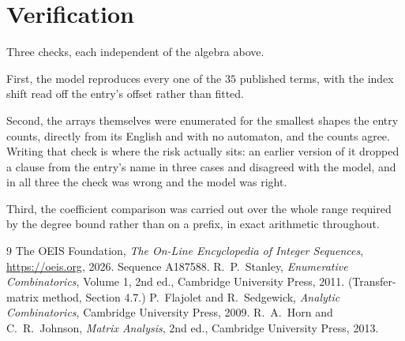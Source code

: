\documentclass[11pt,a4paper]{article}
\theoremstyle{plain}
\theoremstyle{definition}
\begin{document}
\section{Verification}

Three checks, each independent of the algebra above.

First, the model reproduces every one of the $35$ published terms, with the index shift
read off the entry's offset rather than fitted.

Second, the arrays themselves were enumerated for the smallest shapes the entry counts,
directly from its English and with no automaton, and the counts agree. Writing that check is
where the risk actually sits: an earlier version of it dropped a clause from the entry's name
in three cases and disagreed with the model, and in all three the check was wrong and the model
was right.

Third, the coefficient comparison was carried out over the whole range required by the degree
bound rather than on a prefix, in exact arithmetic throughout.

\begin{thebibliography}{9}
 The OEIS Foundation, \emph{The On-Line Encyclopedia of Integer
Sequences}, \url{https://oeis.org}, 2026. Sequence A187588.
 R.~P.~Stanley, \emph{Enumerative Combinatorics}, Volume 1, 2nd ed.,
Cambridge University Press, 2011. (Transfer-matrix method, Section 4.7.)
 P.~Flajolet and R.~Sedgewick, \emph{Analytic Combinatorics}, Cambridge
University Press, 2009.
 R.~A.~Horn and C.~R.~Johnson, \emph{Matrix Analysis}, 2nd ed., Cambridge
University Press, 2013.
\end{thebibliography}
\end{document}
